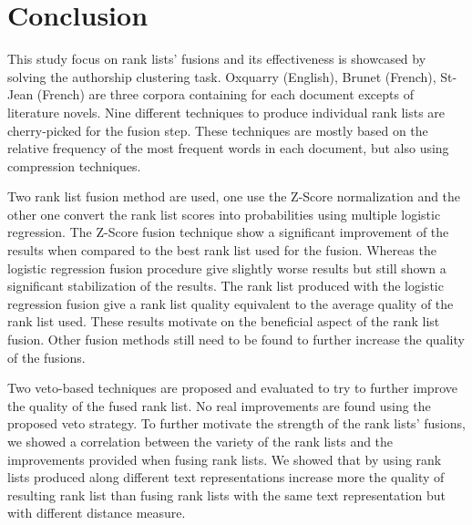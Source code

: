 \section{Conclusion \label{sec:conclusion}}

This study focus on rank lists' fusions and its effectiveness is showcased by solving the authorship clustering task.
Oxquarry (English), Brunet (French), St-Jean (French) are three corpora containing for each document excepts of literature novels.
Nine different techniques to produce individual rank lists are cherry-picked for the fusion step.
These techniques are mostly based on the relative frequency of the most frequent words in each document, but also using compression techniques.

Two rank list fusion method are used, one use the Z-Score normalization and the other one convert the rank list scores into probabilities using multiple logistic regression.
The Z-Score fusion technique show a significant improvement of the results when compared to the best rank list used for the fusion.
Whereas the logistic regression fusion procedure give slightly worse results but still shown a significant stabilization of the results.
The rank list produced with the logistic regression fusion give a rank list quality equivalent to the average quality of the rank list used.
These results motivate on the beneficial aspect of the rank list fusion.
Other fusion methods still need to be found to further increase the quality of the fusions.

Two veto-based techniques are proposed and evaluated to try to further improve the quality of the fused rank list.
No real improvements are found using the proposed veto strategy.
To further motivate the strength of the rank lists' fusions, we showed a correlation between the variety of the rank lists and the improvements provided when fusing rank lists.
We showed that by using rank lists produced along different text representations increase more the quality of resulting rank list than fusing rank lists with the same text representation but with different distance measure.

